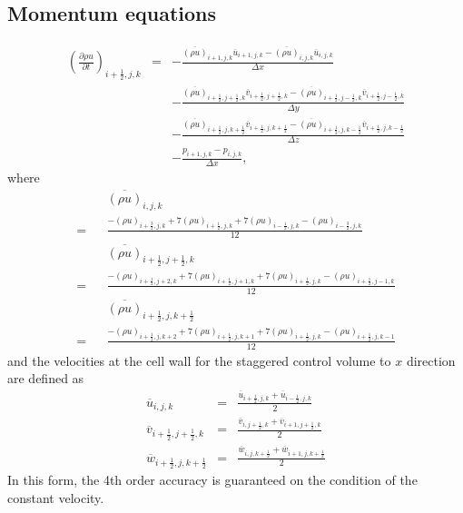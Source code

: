 \subsection{Momentum equations}
\begin{eqnarray}
\left(\frac{\partial \rho u}{\partial t}\right)_{i+\frac{1}{2},j,k}
&=& - \frac{\overline{(\rho u)}_{i+1,j,k} \overline{u}_{i+1,j,k} 
           -\overline{(\rho u)}_{i,j,k} \overline{u}_{i,j,k}}
     {\Delta x}\nonumber\\
& & - \frac{\overline{(\rho u)}_{i+\frac{1}{2},j+\frac{1}{2},k}  \overline{v}_{i+\frac{1}{2},j+\frac{1}{2},k} 
           -\overline{(\rho u)}_{i+\frac{1}{2},j-\frac{1}{2},k}  \overline{v}_{i+\frac{1}{2},j-\frac{1}{2},k}}
     {\Delta y}\nonumber\\
& & - \frac{\overline{(\rho u)}_{i+\frac{1}{2},j,k+\frac{1}{2}}  \overline{v}_{i+\frac{1}{2},j,k+\frac{1}{2}} 
           -\overline{(\rho u)}_{i+\frac{1}{2},j,k-\frac{1}{2}}  \overline{v}_{i+\frac{1}{2},j,k-\frac{1}{2}}}
     {\Delta z}\nonumber\\
& & -\frac{p_{i+1,j,k}-p_{i,j,k}}{\Delta x},
\end{eqnarray}
where 
\begin{eqnarray}
&& \overline{(\rho u)}_{i,j,k} \nonumber\\
= && \frac{-(\rho u)_{i+\frac{3}{2},j,k}+7(\rho u)_{i+\frac{1}{2},j,k}+7(\rho u)_{i-\frac{1}{2},j,k}-(\rho u)_{i-\frac{3}{2},j,k}}{12}\\
&& \overline{(\rho u)}_{i+\frac{1}{2},j+\frac{1}{2},k} \nonumber\\
= && \frac{-(\rho u)_{i+\frac{1}{2},j+2,k}+7(\rho u)_{i+\frac{1}{2},j+1,k}+7(\rho u)_{i+\frac{1}{2},j,k}-(\rho u)_{i+\frac{1}{2},j-1,k}}{12}\\
&& \overline{(\rho u)}_{i+\frac{1}{2},j,k+\frac{1}{2}} \nonumber\\
= &&\frac{-(\rho u)_{i+\frac{1}{2},j,k+2}+7(\rho u)_{i+\frac{1}{2},j,k+1}+7(\rho u)_{i+\frac{1}{2},j,k}-(\rho u)_{i+\frac{1}{2},j,k-1}}{12}
\end{eqnarray}
and the velocities at the cell wall for the staggered control volume to $x$ direction are
defined as
\begin{eqnarray}
\overline{u}_{i,j,k} &=& \frac{\overline{u}_{i+\frac{1}{2},j,k}+\overline{u}_{i-\frac{1}{2},j,k}}{2}\\
\overline{v}_{i+\frac{1}{2},j+\frac{1}{2},k} &=& 
\frac{\overline{v}_{i,j+\frac{1}{2},k}+\overline{v}_{i+1,j+\frac{1}{2},k}}{2}\\
\overline{w}_{i+\frac{1}{2},j,k+\frac{1}{2}} &=& 
\frac{\overline{w}_{i,j,k+\frac{1}{2}}+\overline{w}_{i+1,j,k+\frac{1}{2}}}{2}
\end{eqnarray}
In this form, the 4th order accuracy is guaranteed 
on the condition of the constant velocity.

